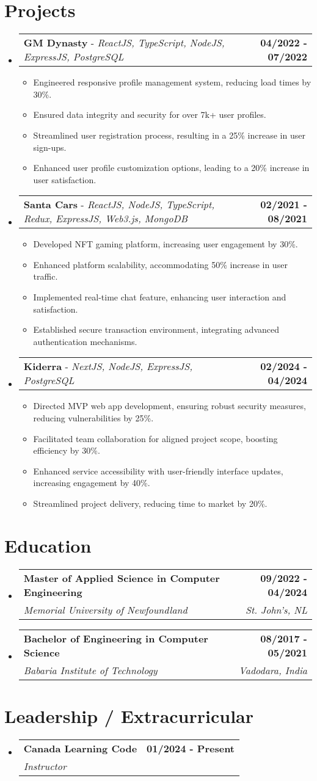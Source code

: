\documentclass[letterpaper,11pt]{article}
\makeatletter
\newcommand{\resumeItem}[1]{
  \item\small{
    {#1 \vspace{-2pt}}
  }
}
\newcommand{\resumeSubheading}[4]{
  \vspace{-2pt}\item
    \begin{tabular*}{1.0\textwidth}[t]{l@{\extracolsep{\fill}}r}
      \textbf{#1} & \textbf{\small #2} \\
      \textit{\small#3} & \textit{\small #4} \\
    \end{tabular*}\vspace{-7pt}
}
\newcommand{\resumeProjectHeading}[2]{
    \item
    \begin{tabular*}{1.001\textwidth}{l@{\extracolsep{\fill}}r}
      \small#1 & \textbf{\small #2}\\
    \end{tabular*}\vspace{-7pt}
}
\newcommand{\resumeSubHeadingListStart}{\begin{itemize}[leftmargin=0.0in, label={}]}
\newcommand{\resumeSubHeadingListEnd}{\end{itemize}}
\newcommand{\resumeItemListStart}{\begin{itemize}}
\newcommand{\resumeItemListEnd}{\end{itemize}\vspace{-5pt}}
\makeatother
\begin{document}
\section{Projects}
\vspace{-6pt}
\resumeSubHeadingListStart
    \resumeProjectHeading
        {\textbf{GM Dynasty} - \emph{ReactJS, TypeScript, NodeJS, ExpressJS, PostgreSQL}}{04/2022 - 07/2022}
        \resumeItemListStart
          \resumeItem{Engineered responsive profile management system, reducing load times by 30\%.}
          \resumeItem{Ensured data integrity and security for over 7k+ user profiles.}
          \resumeItem{Streamlined user registration process, resulting in a 25\% increase in user sign-ups.}
          \resumeItem{Enhanced user profile customization options, leading to a 20\% increase in user satisfaction.}
        \resumeItemListEnd
        \vspace{-16pt}
    \resumeProjectHeading
        {\textbf{Santa Cars} - \emph{ReactJS, NodeJS, TypeScript, Redux, ExpressJS, Web3.js, MongoDB}}{02/2021 - 08/2021}
        \resumeItemListStart
          \resumeItem{Developed NFT gaming platform, increasing user engagement by 30\%.}
          \resumeItem{Enhanced platform scalability, accommodating 50\% increase in user traffic.}
          \resumeItem{Implemented real-time chat feature, enhancing user interaction and satisfaction.}
          \resumeItem{Established secure transaction environment, integrating advanced authentication mechanisms.}
        \resumeItemListEnd
                \vspace{-16pt}
    \resumeProjectHeading
        {\textbf{Kiderra} - \emph{NextJS, NodeJS, ExpressJS, PostgreSQL}}{02/2024 - 04/2024}
        \resumeItemListStart
          \resumeItem{Directed MVP web app development, ensuring robust security measures, reducing vulnerabilities by 25\%.}
          \resumeItem{Facilitated team collaboration for aligned project scope, boosting efficiency by 30\%.}
          \resumeItem{Enhanced service accessibility with user-friendly interface updates, increasing engagement by 40\%.}
          \resumeItem{Streamlined project delivery, reducing time to market by 20\%.}
        \resumeItemListEnd
  \resumeSubHeadingListEnd
\vspace{-15pt}

\section{Education}
\resumeSubHeadingListStart
\resumeSubheading
{Master of Applied Science in Computer Engineering}{09/2022 - 04/2024}
{Memorial University of Newfoundland}{St. John's, NL}
\resumeSubheading
{Bachelor of Engineering in Computer Science}{08/2017 - 05/2021}
{Babaria Institute of Technology}{Vadodara, India}
\resumeSubHeadingListEnd
\section{Leadership / Extracurricular}
    \resumeSubHeadingListStart
        \resumeSubheading{Canada Learning Code}{01/2024 - Present}{Instructor}{}
    \resumeSubHeadingListEnd
\end{document}
